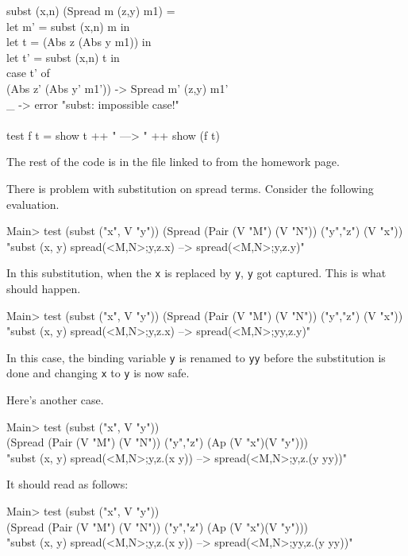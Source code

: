 \documentclass[11pt]{article}
\begin{document}
\begin{program*}
\>  subst (x,n) (Spread m (z,y) m1) =  \\
\>       let m' = subst (x,n) m in \\
\>       let t = (Abs z (Abs y m1)) in \\
\>       let t' = subst (x,n) t in \\
\>          case t' of \\
\>             (Abs z' (Abs y' m1')) -> Spread m' (z,y) m1' \\
\>             \_ -> error "subst: impossible case!" \\
\> \\
\>  test f t = show t ++ " ---> " ++ show (f t)
\> \\ 
\end{program*}

The rest of the code is in the file linked to from the homework page.

There is problem with substitution on spread terms.  Consider the following evaluation.
\begin{program*}
\> Main> test (subst ("x", V "y")) (Spread (Pair (V "M") (V "N")) ("y","z") (V "x")) \\
\> "subst (x, y) spread(<M,N>;y,z.x)  -->  spread(<M,N>;y,z.y)"  
\end{program*}
In this substitution, when the {\tt{x}} is replaced by {\tt{y}}, {\tt{y}} got captured.  This is what should happen.
\begin{program*}
\>  Main> test (subst ("x", V "y")) (Spread (Pair (V "M") (V "N")) ("y","z") (V "x")) \\
\>  "subst (x, y) spread(<M,N>;y,z.x)  -->  spread(<M,N>;yy,z.y)" 
\end{program*}
In this case, the binding variable {\tt{y}} is renamed to {\tt{yy}} before the
substitution is done and changing {\tt{x}} to {\tt{y}} is now safe.  

Here's another case.
\begin{program*}
\>  Main> test (subst ("x", V "y")) \\
\>             (Spread (Pair (V "M") (V "N")) ("y","z") (Ap (V "x")(V "y"))) \\
\>  "subst (x, y) spread(<M,N>;y,z.(x y))  -->  spread(<M,N>;y,z.(y yy))" \\
\end{program*} 
It should read as follows:
\begin{program*} 
\>  Main> test (subst ("x", V "y")) \\
\>             (Spread (Pair (V "M") (V "N")) ("y","z") (Ap (V "x")(V "y"))) \\
\>  "subst (x, y) spread(<M,N>;y,z.(x y))  -->  spread(<M,N>;yy,z.(y yy))" 
\end{program*}
\end{document}
